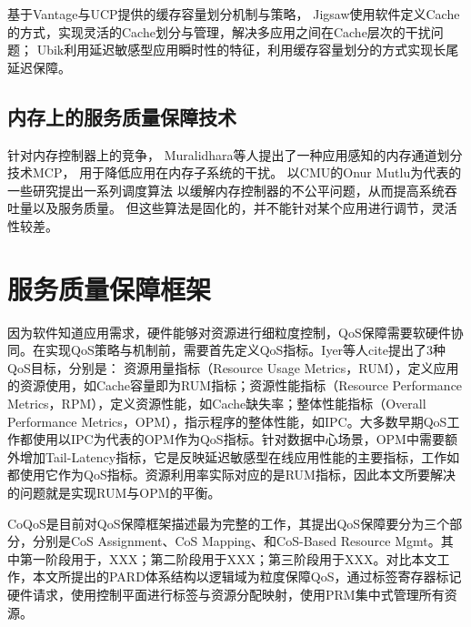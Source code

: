 基于Vantage与UCP提供的缓存容量划分机制与策略，
Jigsaw\cite{Jigsaw:2013}使用软件定义Cache的方式，实现灵活的Cache划分与管理，解决多应用之间在Cache层次的干扰问题；
Ubik\cite{kasture_ubik:_2014}利用延迟敏感型应用瞬时性的特征，利用缓存容量划分的方式实现长尾延迟保障。


\subsection{内存上的服务质量保障技术}

针对内存控制器上的竞争，
Muralidhara等人提出了一种应用感知的内存通道划分技术MCP\cite{muralidhara_reducing_2011}，
用于降低应用在内存子系统的干扰。
以CMU的Onur Mutlu为代表的一些研究提出一系列调度算法\cite{mutlu_stall-time_2007,
mutlu_parallelism-aware_2008, kim_atlas:_2010, kim_thread_2010}
以缓解内存控制器的不公平问题，从而提高系统吞吐量以及服务质量。
但这些算法是固化的，并不能针对某个应用进行调节，灵活性较差。

%
%

%


\section{服务质量保障框架}

因为软件知道应用需求，硬件能够对资源进行细粒度控制，QoS保障需要软硬件协同。在实现QoS策略与机制前，需要首先定义QoS指标。Iyer等人cite{}提出了3种QoS目标，分别是： 资源用量指标（Resource Usage Metrics，RUM），定义应用的资源使用，如Cache容量即为RUM指标；资源性能指标（Resource Performance  Metrics，RPM），定义资源性能，如Cache缺失率；整体性能指标（Overall Performance Metrics，OPM），指示程序的整体性能，如IPC。大多数早期QoS工作\cite{}都使用以IPC为代表的OPM作为QoS指标。针对数据中心场景，OPM中需要额外增加Tail-Latency指标，它是反映延迟敏感型在线应用性能的主要指标，工作如\cite{}都使用它作为QoS指标。资源利用率实际对应的是RUM指标，因此本文所要解决的问题就是实现RUM与OPM的平衡。

CoQoS是目前对QoS保障框架描述最为完整的工作，其提出QoS保障要分为三个部分，分别是CoS Assignment、CoS Mapping、和CoS-Based Resource Mgmt。其中第一阶段用于，XXX；第二阶段用于XXX；第三阶段用于XXX。对比本文工作，本文所提出的PARD体系结构以逻辑域为粒度保障QoS，通过标签寄存器标记硬件请求，使用控制平面进行标签与资源分配映射，使用PRM集中式管理所有资源。

